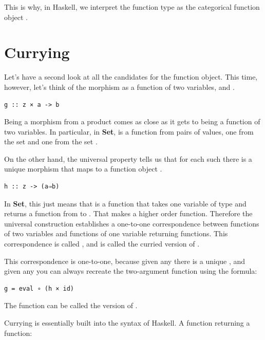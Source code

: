 This is why, in Haskell, we interpret the function type
 as the categorical function object
.

\section{Currying}\label{currying}

Let's have a second look at all the candidates for the function object.
This time, however, let's think of the morphism  as a function
of two variables,  and .

\begin{verbatim}
g :: z × a -> b
\end{verbatim}

Being a morphism from a product comes as close as it gets to being a
function of two variables. In particular, in \textbf{Set},  is
a function from pairs of values, one from the set  and one
from the set .

On the other hand, the universal property tells us that for each such
 there is a unique morphism  that maps  to
a function object .

\begin{verbatim}
h :: z -> (a⇒b)
\end{verbatim}

In \textbf{Set}, this just means that  is a function that
takes one variable of type  and returns a function from
 to . That makes  a higher order function.
Therefore the universal construction establishes a one-to-one
correspondence between functions of two variables and functions of one
variable returning functions. This correspondence is called
, and  is called the curried version of
.

This correspondence is one-to-one, because given any  there is
a unique , and given any  you can always recreate
the two-argument function  using the formula:

\begin{verbatim}
g = eval ∘ (h × id)
\end{verbatim}

The function  can be called the  version of
.

Currying is essentially built into the syntax of Haskell. A function
returning a function:

